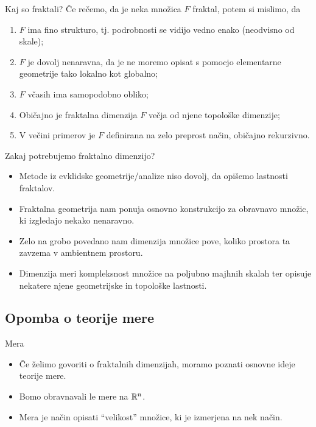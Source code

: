 \documentclass[10pt]{beamer}
\begin{document}
\begin{frame}{Kaj so fraktali?}
    Če rečemo, da je neka množica \(F\) fraktal, potem si mislimo, da
    \begin{enumerate}
        \item \(F\) ima fino strukturo, tj. podrobnosti se vidijo vedno enako (neodvisno od skale);
        \item \(F\) je dovolj nenaravna, da je ne moremo opisat s pomocjo elementarne geometrije tako lokalno kot globalno;
        \item \(F\) včasih ima samopodobno obliko;
        \item Običajno je fraktalna dimenzija \(F\) večja od njene topološke dimenzije;
        \item V večini primerov  je \(F\) definirana na zelo preprost način, običajno rekurzivno.
    \end{enumerate}   
\end{frame}

\begin{frame}{Zakaj potrebujemo fraktalno dimenzijo?}
    \begin{itemize}
        \item Metode iz evklidske geometrije/analize niso dovolj, da opišemo lastnosti fraktalov.
        \item Fraktalna geometrija nam ponuja osnovno konstrukcijo za obravnavo množic, ki izgledajo nekako nenaravno.
        \item Zelo na grobo povedano nam dimenzija množice pove, koliko prostora ta zavzema v ambientnem prostoru. 
        \item Dimenzija meri kompleksnost množice na poljubno majhnih skalah ter opisuje nekatere njene geometrijske in topološke lastnosti.
    \end{itemize}    
\end{frame}


\subsection{Opomba o teorije mere}
\begin{frame}{Mera}
    \begin{itemize}
        \item Če želimo govoriti o fraktalnih dimenzijah, moramo poznati osnovne ideje teorije mere.
        \item Bomo obravnavali le mere na \(\mathbb{R}^n\).
        \item Mera je način opisati "`velikost"' množice, ki je izmerjena na nek način.
    \end{itemize}    
\end{frame}
\end{document}
